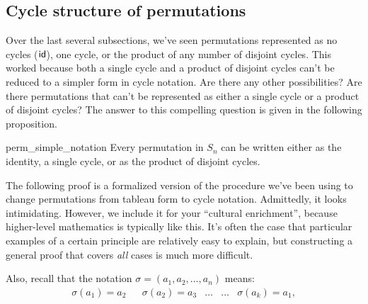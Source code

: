 \subsection{Cycle structure of permutations}

Over the last several subsections, we've seen permutations represented as no cycles (${\sf{i}d}$), one cycle, or the product of any number of disjoint cycles.  This worked because both a single cycle and a product of disjoint cycles can't be reduced to a simpler form in cycle notation.  Are there any other possibilities?   Are there permutations that can't be represented as either a single cycle or a product of disjoint cycles?  The answer to this compelling question is given in the following proposition. 


\begin{prop}{perm_simple_notation}     
Every permutation in $S_n$ can be written either as the identity, a  single cycle, or as the product of disjoint cycles. 
\end{prop}

\noindent
The following  proof is a formalized version of the procedure we've been using to change permutations from tableau form to cycle notation.
Admittedly, it looks intimidating. However, we include it for your ``cultural enrichment'', because higher-level  mathematics is typically  like this. It's often the case that  particular examples of a certain principle are relatively easy to explain, but constructing a  general proof that covers \emph{all} cases is much more difficult.

\medskip
\noindent
Also, recall  that the notation $\sigma = (a_1, a_2, \ldots, a_n)$ means:
\begin{align*}
\sigma( a_1 )  = a_2  & &
\sigma( a_2 )  = a_3 & 
 \ldots   & \ldots & 
\sigma( a_k )  = a_1,
\end{align*}

